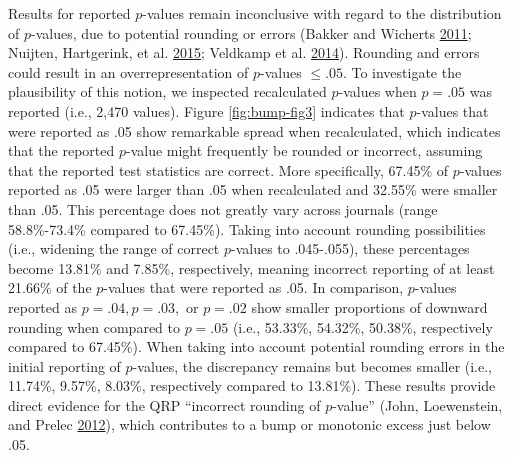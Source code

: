 \documentclass[a5paper]{book}
\begin{document}
Results for reported \(p\)-values remain inconclusive with regard to the
distribution of \(p\)-values, due to potential rounding or errors
(Bakker and Wicherts
\protect\hyperlink{ref-doi:10.3758ux2fs13428-011-0089-5}{2011}; Nuijten,
Hartgerink, et al.
\protect\hyperlink{ref-doi:10.3758ux2fs13428-015-0664-2}{2015}; Veldkamp
et al.
\protect\hyperlink{ref-doi:10.1371ux2fjournal.pone.0114876}{2014}).
Rounding and errors could result in an overrepresentation of
\(p\)-values \(\leq.05\). To investigate the plausibility of this
notion, we inspected recalculated \(p\)-values when \(p=.05\) was
reported (i.e., 2,470 values). Figure \ref{fig:bump-fig3} indicates that
\(p\)-values that were reported as .05 show remarkable spread when
recalculated, which indicates that the reported \(p\)-value might
frequently be rounded or incorrect, assuming that the reported test
statistics are correct. More specifically, 67.45\% of \(p\)-values
reported as .05 were larger than .05 when recalculated and 32.55\% were
smaller than .05. This percentage does not greatly vary across journals
(range 58.8\%-73.4\% compared to 67.45\%). Taking into account rounding
possibilities (i.e., widening the range of correct \(p\)-values to
.045-.055), these percentages become 13.81\% and 7.85\%, respectively,
meaning incorrect reporting of at least 21.66\% of the \(p\)-values that
were reported as .05. In comparison, \(p\)-values reported as
\(p=.04, p=.03,\) or \(p=.02\) show smaller proportions of downward
rounding when compared to \(p=.05\) (i.e., 53.33\%, 54.32\%, 50.38\%,
respectively compared to 67.45\%). When taking into account potential
rounding errors in the initial reporting of \(p\)-values, the
discrepancy remains but becomes smaller (i.e., 11.74\%, 9.57\%, 8.03\%,
respectively compared to 13.81\%). These results provide direct evidence
for the QRP \enquote{incorrect rounding of \(p\)-value} (John,
Loewenstein, and Prelec
\protect\hyperlink{ref-doi:10.1177ux2f0956797611430953}{2012}), which
contributes to a bump or monotonic excess just below .05.
\end{document}
